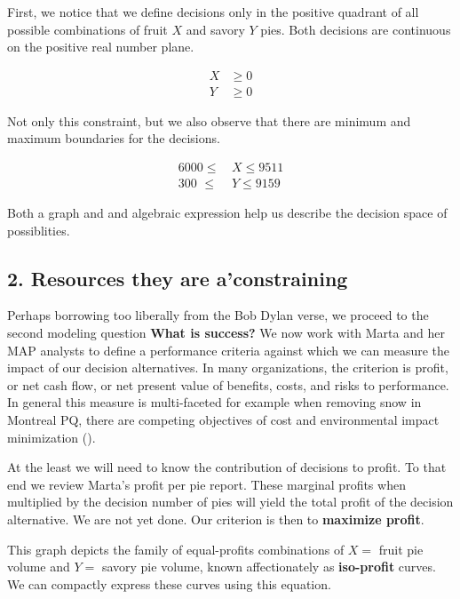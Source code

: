 \documentclass[
]{book}
\begin{document}
First, we notice that we define decisions only in the positive quadrant of all possible combinations of fruit \(X\) and savory \(Y\) pies. Both decisions are continuous on the positive real number plane.

\[
\begin{align}
X &\geq 0 \\
Y &\geq 0
\end{align}
\]

Not only this constraint, but we also observe that there are minimum and maximum boundaries for the decisions.

\[
\begin{align}
6000 \leq \, &X \leq 9511 \\	
300 \,\,\leq \,\,  &Y \leq 9159
\end{align}
\]

Both a graph and and algebraic expression help us describe the decision space of possiblities.

\hypertarget{resources-they-are-aconstraining}{%
\subsection{2. Resources they are a'constraining}\label{resources-they-are-aconstraining}}

Perhaps borrowing too liberally from the Bob Dylan verse, we proceed to the second modeling question \textbf{What is success?} We now work with Marta and her MAP analysts to define a performance criteria against which we can measure the impact of our decision alternatives. In many organizations, the criterion is profit, or net cash flow, or net present value of benefits, costs, and risks to performance. In general this measure is multi-faceted for example when removing snow in Montreal PQ, there are competing objectives of cost and environmental impact minimization (\citet{Labelle2002}).

At the least we will need to know the contribution of decisions to profit. To that end we review Marta's profit per pie report. These marginal profits when multiplied by the decision number of pies will yield the total profit of the decision alternative. We are not yet done. Our criterion is then to \textbf{maximize profit}.

This graph depicts the family of equal-profits combinations of \(X=\) fruit pie volume and \(Y=\) savory pie volume, known affectionately as \textbf{iso-profit} curves. We can compactly express these curves using this equation.
\end{document}
